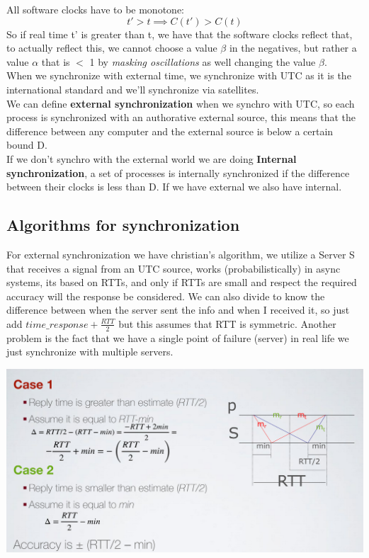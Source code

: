\documentclass[11pt, a4paper]{article}
\begin{document}
All software clocks have to be monotone:
$$ t' > t \implies C(t') > C(t)$$
So if real time t' is greater than t, we have that the software clocks reflect that, to actually reflect this, we cannot choose a value $\beta$ in the negatives, but rather
a value $\alpha$ that is $<$ 1 by \textit{masking oscillations} as well changing the value $\beta$.\\
When we synchronize with external time, we synchronize with UTC as it is the international standard and we'll synchronize via satellites.\\
We can define \textbf{external synchronization} when we synchro with UTC, so each process is synchronized with an authorative external source, this means that the difference between any computer and the external source is below a certain bound D.\\
If we don't synchro with the external world we are doing \textbf{Internal synchronization}, a set of processes is internally synchronized if the difference between their clocks is less than D. If we have external we also have internal.
\subsection{Algorithms for synchronization}
For external synchronization we have christian's algorithm, we utilize a Server S that receives a signal from an UTC source, works (probabilistically) in async systems, its based on RTTs, and only if RTTs are small and respect the required accuracy will the response be considered. We can also divide  to know the difference between when the server sent the info and when I received it, so just add $time\_ response + \frac{RTT}{2}$ but this assumes that RTT is symmetric.
Another problem is the fact that we have a single point of failure (server) in real life we just synchronize with multiple servers.
\begin{center}
    \includegraphics[scale=0.5]{img/synchro_algs/image.png}
\end{center}
\end{document}
